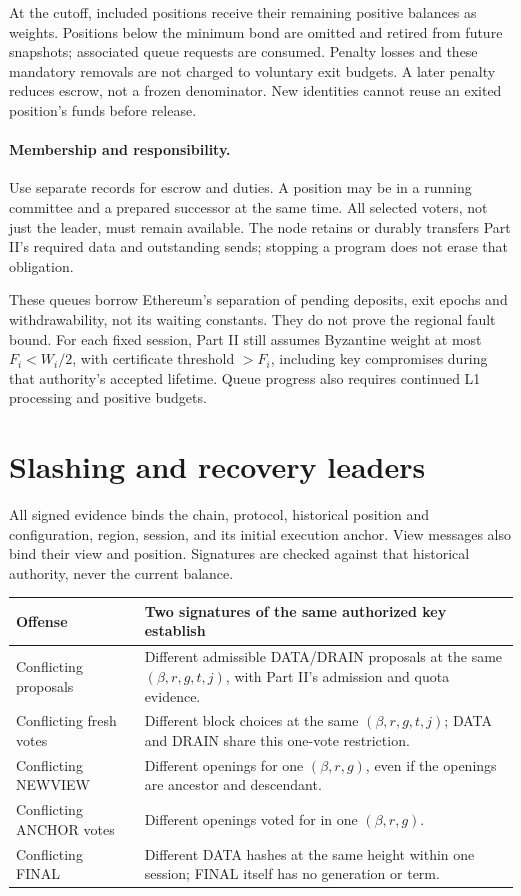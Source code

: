 \documentclass[11pt,a4paper]{article}
\begin{document}
At the cutoff, included positions receive their remaining positive
balances as weights. Positions below the minimum bond are omitted and
retired from future snapshots; associated queue requests are consumed.
Penalty losses and these mandatory removals are not charged to voluntary
exit budgets. A later penalty reduces escrow, not a frozen denominator.
New identities cannot reuse an exited position's funds before release.

\paragraph{Membership and responsibility.}
Use separate records for escrow and duties. A position may be in a
running committee and a prepared successor at the same time. All selected
voters, not just the leader, must remain available. The node retains or
durably transfers Part II's required data and outstanding sends; stopping
a program does not erase that obligation.

These queues borrow Ethereum's separation of pending deposits, exit
epochs and withdrawability, not its waiting constants. They do not prove
the regional fault bound. For each fixed session, Part II still assumes
Byzantine weight at most $F_i<W_i/2$, with certificate threshold $>F_i$,
including key compromises during that authority's accepted lifetime.
Queue progress also requires continued L1 processing and positive budgets.

\newpage
\section{Slashing and recovery leaders}
\label{sec:slash}
All signed evidence binds the chain, protocol, historical position and
configuration, region, session, and its initial execution anchor. View
messages also bind their view and position. Signatures are checked against
that historical authority, never the current balance.

\begin{tabularx}{\linewidth}{@{}p{.25\linewidth}Y@{}}\toprule
Offense & Two signatures of the same authorized key establish\\\midrule
Conflicting proposals & Different admissible DATA/DRAIN proposals at the
same $(\beta,r,g,t,j)$, with Part II's admission and quota evidence.\\
Conflicting fresh votes & Different block choices at the same
$(\beta,r,g,t,j)$; DATA and DRAIN share this one-vote restriction.\\
Conflicting NEWVIEW & Different openings for one $(\beta,r,g)$, even if
the openings are ancestor and descendant.\\
Conflicting ANCHOR votes & Different openings voted for in one
$(\beta,r,g)$.\\
Conflicting FINAL & Different DATA hashes at the same height within one
session; FINAL itself has no generation or term.\\\bottomrule
\end{tabularx}
\end{document}
